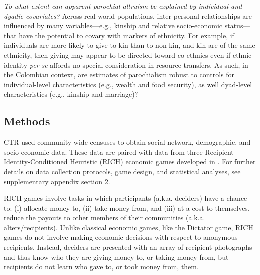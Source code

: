 \documentclass[bibauthoryear]{aa}
\begin{document}
\begin{enumerate*}[label={Q(\arabic*)},font={\color{blue!50!black}\bfseries}]
\item \label{q5} \emph{To what extent can apparent parochial altruism be explained by individual and dyadic covariates?} 
Across real-world populations, inter-personal relationships are influenced by many variables---e.g., kinship and relative socio-economic status---that have the potential to covary with markers of ethnicity. For example, if individuals are more likely to give to kin than to non-kin, and kin are of the same ethnicity, then giving may appear to be directed toward co-ethnics even if ethnic identity \emph{per se} affords no special consideration in resource transfers. As such, in the Colombian context, are estimates of parochialism  robust to controls for individual-level  characteristics (e.g., wealth and food security), as well dyad-level characteristics (e.g., kinship and  marriage)? 

\end{enumerate*}


\subsection{Methods}
CTR used community-wide censuses to obtain social network, demographic, and socio-economic data.  These data are paired with data from three Recipient Identity-Conditioned Heuristic (RICH) economic games developed in \citet{gervais2017rich}. For further details on data collection protocols, game design, and statistical analyses, see supplementary appendix section 2.

 RICH games involve tasks in which participants (a.k.a. deciders) have a chance to: (i) allocate money to, (ii) take money from, and (iii) at a cost to themselves, reduce the payouts to other members of their communities (a.k.a. alters/recipients). Unlike classical economic games, like the Dictator  game, RICH games do not involve making economic decisions with respect to anonymous recipients. Instead, deciders are presented with an array of recipient photographs and thus know who they are giving money to, or taking money from, but recipients do not learn who gave to, or took money from, them. 
\end{document}
